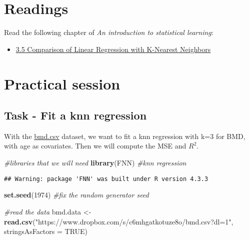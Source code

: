 \documentclass[
]{book}
\newenvironment{Shaded}{\begin{snugshade}}{\end{snugshade}}
\newcommand{\AttributeTok}[1]{\textcolor[rgb]{0.13,0.29,0.53}{#1}}
\newcommand{\CommentTok}[1]{\textcolor[rgb]{0.56,0.35,0.01}{\textit{#1}}}
\newcommand{\ConstantTok}[1]{\textcolor[rgb]{0.56,0.35,0.01}{#1}}
\newcommand{\DecValTok}[1]{\textcolor[rgb]{0.00,0.00,0.81}{#1}}
\newcommand{\FunctionTok}[1]{\textcolor[rgb]{0.13,0.29,0.53}{\textbf{#1}}}
\newcommand{\NormalTok}[1]{#1}
\newcommand{\OtherTok}[1]{\textcolor[rgb]{0.56,0.35,0.01}{#1}}
\newcommand{\StringTok}[1]{\textcolor[rgb]{0.31,0.60,0.02}{#1}}
\providecommand{\tightlist}{%
  \setlength{\itemsep}{0pt}\setlength{\parskip}{0pt}}
\begin{document}
\section{Readings}\label{knn.read}

Read the following chapter of \emph{An introduction to statistical learning}:

\begin{itemize}
\tightlist
\item
  \href{https://static1.squarespace.com/static/5ff2adbe3fe4fe33db902812/t/6062a083acbfe82c7195b27d/1617076404560/ISLR\%2BSeventh\%2BPrinting.pdf}{3.5 Comparison of Linear Regression with K-Nearest Neighbors}
\end{itemize}

\section{Practical session}\label{knn.prac}

\subsection*{Task - Fit a knn regression}\label{task---fit-a-knn-regression}

With the \href{https://www.dropbox.com/s/7wjsfdaf0wt2kg2/bmd.csv?dl=1}{bmd.csv} dataset, we want to fit a knn regression with k=3 for BMD,
with age as covariates. Then we will compute the MSE and \(R^2\).

\begin{Shaded}
\begin{Highlighting}[]
\CommentTok{\#libraries that we will need}
\FunctionTok{library}\NormalTok{(FNN)   }\CommentTok{\#knn regression}
\end{Highlighting}
\end{Shaded}

\begin{verbatim}
## Warning: package 'FNN' was built under R version 4.3.3
\end{verbatim}

\begin{Shaded}
\begin{Highlighting}[]
\FunctionTok{set.seed}\NormalTok{(}\DecValTok{1974}\NormalTok{) }\CommentTok{\#fix the random generator seed }

\CommentTok{\#read the data}
\NormalTok{bmd.data     }\OtherTok{\textless{}{-}} 
  \FunctionTok{read.csv}\NormalTok{(}\StringTok{"https://www.dropbox.com/s/c6mhgatkotuze8o/bmd.csv?dl=1"}\NormalTok{, }
           \AttributeTok{stringsAsFactors =} \ConstantTok{TRUE}\NormalTok{)}
\end{Highlighting}
\end{Shaded}
\end{document}
